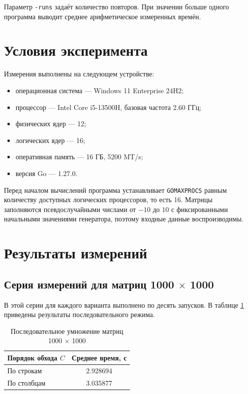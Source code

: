 \documentclass[a4paper,14pt]{extarticle}
\begin{document}
Параметр \texttt{-runs} задаёт количество повторов. При значении больше одного
программа выводит среднее арифметическое измеренных времён.

\section{Условия эксперимента}

Измерения выполнены на следующем устройстве:
\begin{itemize}
    \item операционная система --- Windows 11 Enterprise 24H2;
    \item процессор --- Intel Core i5-13500H, базовая частота 2.60 ГГц;
    \item физических ядер --- 12;
    \item логических ядер --- 16;
    \item оперативная память --- 16 ГБ, 5200 MT/s;
    \item версия Go --- 1.27.0.
\end{itemize}

Перед началом вычислений программа устанавливает
\texttt{GOMAXPROCS} равным количеству доступных логических процессоров, то есть
16. Матрицы заполняются псевдослучайными числами от $-10$ до $10$ с
фиксированными начальными значениями генератора, поэтому входные данные
воспроизводимы.

\section{Результаты измерений}

\subsection{Серия измерений для матриц 1000 \texorpdfstring{$\times$}{x} 1000}

В этой серии для каждого варианта выполнено по десять запусков. В таблице
\ref{tab:sequential1000} приведены результаты последовательного режима.

\begin{table}[ht]
\centering
\caption{Последовательное умножение матриц 1000 \texorpdfstring{$\times$}{x} 1000}
\label{tab:sequential1000}
\begin{tabular}{lc}
\toprule
Порядок обхода $C$ & Среднее время, с \\
\midrule
По строкам & 2.928694 \\
По столбцам & 3.035877 \\
\bottomrule
\end{tabular}
\end{table}
\end{document}
